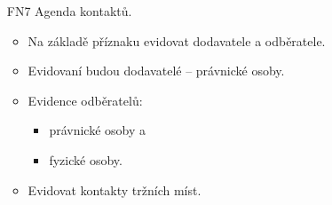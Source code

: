 \documentclass[thesis=B,czech]{FITthesis}[2012/06/26]
\begin{document}
\begin{enumerate}
\begin{itemize}
	\end{itemize}
	\item[FN7] Agenda kontaktů.
	\begin{itemize}
		\item Na základě příznaku evidovat dodavatele a odběratele.
		\item Evidovaní budou dodavatelé -- právnické osoby.
		\item Evidence odběratelů:
		\begin{itemize}
			\item právnické osoby a
			\item fyzické osoby.
		\end{itemize}
		\item Evidovat kontakty tržních míst.
	\end{itemize}


\end{enumerate}
\end{document}
